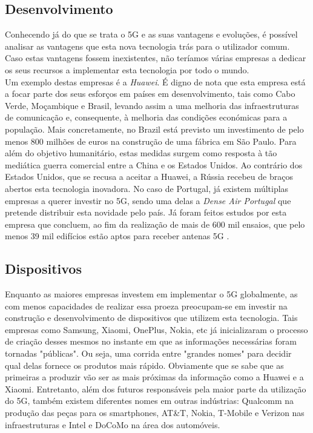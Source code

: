 \documentclass{llncs}
\begin{document}
\subsection{Desenvolvimento}
Conhecendo já do que se trata o 5G e as suas vantagens e evoluções,
é possível analisar as vantagens que esta nova tecnologia trás para
o utilizador comum.\\
Caso estas vantagens fossem inexistentes, não teríamos várias empresas
a dedicar os seus recursos a implementar esta tecnologia por todo o mundo.\\
Um exemplo destas empresas é a \textit{Huawei}.
É digno de nota que esta empresa está a focar parte dos seus esforços em
países em desenvolvimento, tais como Cabo Verde, Moçambique e Brasil,
levando assim a uma melhoria das infraestruturas de comunicação e, consequente,
à melhoria das condições económicas para a população. Mais concretamente,
no Brazil está previsto um investimento de pelo menos 800 milhões de euros
na construção de uma fábrica em São Paulo.
Para além do objetivo humanitário, estas medidas surgem como resposta à tão
mediática guerra comercial entre a China e os Estados Unidos.
Ao contrário dos Estados Unidos, que se recusa a aceitar a Huawei, a Rússia
recebeu de braços abertos esta tecnologia inovadora.
No caso de Portugal, já existem múltiplas empresas a querer investir no 5G,
sendo uma delas a \textit{Dense Air Portugal} que pretende distribuir esta
novidade pelo país.
Já foram feitos estudos por esta empresa que concluem, ao fim da
realização de mais de 600 mil ensaios, que pelo menos 39 mil edifícios
estão aptos para receber antenas 5G \cite{5GPortugal}.

\subsection{Dispositivos}
Enquanto as maiores empresas investem em implementar o 5G globalmente, as com
menos capacidades de realizar essa proeza preocupam-se em investir na construção
e desenvolvimento de dispositivos que utilizem esta tecnologia. Tais empresas como
Samsung, Xiaomi, OnePlus, Nokia, etc já inicializaram o processo de criação
desses mesmos no instante em que as informações necessárias foram tornadas "públicas".
Ou seja, uma corrida entre "grandes nomes" para decidir qual delas fornece os produtos
mais rápido. Obviamente que se sabe que as primeiras a produzir vão ser as mais próximas da informação como a Huawei e a Xiaomi.
Entretanto, além dos futuros responsáveis pela maior parte da utilização
do 5G, também existem diferentes nomes em outras indústrias: Qualcomm 
na produção das peças para os smartphones, AT\&T, Nokia, T-Mobile e Verizon nas
infraestruturas e Intel e DoCoMo na área dos automóveis. 
\end{document}
